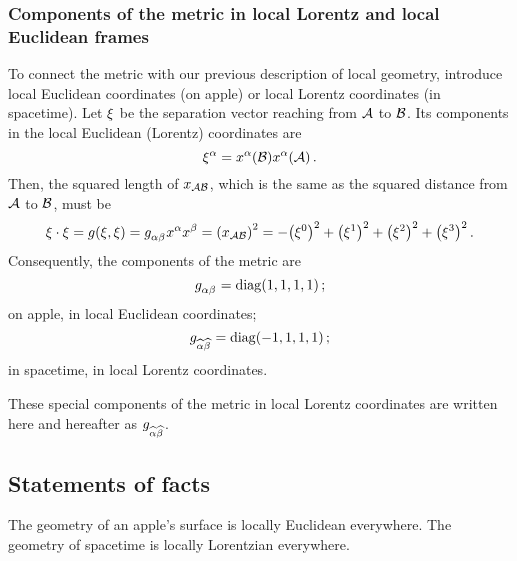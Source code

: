 \subsubsection{Components of the metric in local Lorentz and local Euclidean frames}
%
To connect the metric with our previous description of local geometry, introduce local Euclidean coordinates (on apple) or local Lorentz coordinates (in spacetime). Let $\xi$ be the separation vector reaching from $\point A$ to $\point B$. Its components in the local Euclidean (Lorentz) coordinates are
%
\begin{equation*}
  \tvec\svec\alpha = \tvec\pos\alpha\vat{\point B} \tvec\pos\alpha\vat{\point A}\,.
\end{equation*}
%
Then, the squared length of $\pos_{\point A\point B}$, which is the same as the squared distance from $\point A$ to $\point B$, must be
%
\begin{equation*}
  \svec\iprod\svec = \metric\vat{\svec, \svec}
                   = \tcovmet\alpha\beta\tvec\pos\alpha\tvec\pos\beta
                   = \parens{\pos_{\point A\point B}}^2
                   = -\parens{\tvec\svec 0}^2 + \parens{\tvec\svec 1}^2 + \parens{\tvec\svec 2}^2 + \parens{\tvec\svec 3}^2\,.
\end{equation*}
%
Consequently, the components of the metric are
%
\begin{equation*}
  \tcovmet\alpha\beta = \diag\tuple{1,1,1,1}\,;
\end{equation*}
%
on apple, in local Euclidean coordinates;
%
\begin{equation*}
  \tcovmet{\hidx\alpha}{\hidx\beta} = \diag\tuple{-1,1,1,1}\,;
\end{equation*}
%
in spacetime, in local Lorentz coordinates.

These special components of the metric in local Lorentz coordinates are written here and hereafter as $\tcovmet{\hidx\alpha}{\hidx\beta}$.


\subsection{Statements of facts}
%
The geometry of an apple's surface is locally Euclidean everywhere. The geometry of spacetime is locally Lorentzian everywhere.


